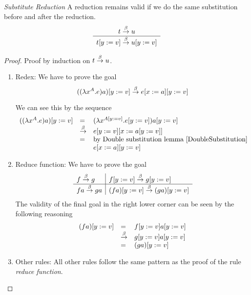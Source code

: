 \begin{theorem}
    \label{SubstituteReduction}
    \emph{Substitute Reduction} A reduction remains valid if we do the same
    substitution before and after the reduction.
    $$
    \begin{array}{c} 
        t \stackrel{\beta}{\to} u
     \\ \hline 
        t[y:=v] \stackrel{\beta}{\to} u[y:=v]
    \end{array}
    $$

    \begin{proof}
        Proof by induction on $t \stackrel{\beta}{\to} u$.


        \begin{enumerate}

        \item Redex: We have to prove the goal
            $$
                ((\lambda x^A. e) a)[y:=v] \stackrel{\beta}{\to} e[x:=a][y:=v]
            $$

            We can see this by the sequence
            $$
            \begin{array}{lll}
                ((\lambda x^A. e) a)[y:=v]
                &=&
                (\lambda x^{A[y:=v]}. e[y:=v]) a[y:=v]
                \\
                &\stackrel{\beta}{\to}&
                e[y:=v][x:=a[y:=v]]
                \\
                &=& \text{by Double substitution lemma~\ref{DoubleSubstitution}}
                \\
                &&e[x:=a][y:=v]
            \end{array}
            $$

        \item Reduce function: We have to prove the goal
            $$
            \begin{array}{l|l}
                f \stackrel{\beta}{\to} g
                & f[y:=v] \stackrel{\beta}{\to} g[y:=v]
                \\
                \hline
                f a \stackrel{\beta}{\to} g a
                &(f a)[y:=v] \stackrel{\beta}{\to} (g a)[y:=v]
            \end{array}
            $$
            The validity of the final goal in the right lower corner can be seen
            by the following reasoning
            $$
            \begin{array}{lll}
                (f a)[y:=v]
                &=&
                f[y:=v] a[y:=v]
                \\
                &\stackrel{\beta}{\to}&
                g[y:=v] a[y:=v]
                \\
                &=&
                (g a)[y:=v]
            \end{array}
            $$

        \item Other rules: All other rules follow the same pattern as the proof
            of the rule \emph{reduce function}.
        \end{enumerate}
    \end{proof}
\end{theorem}






